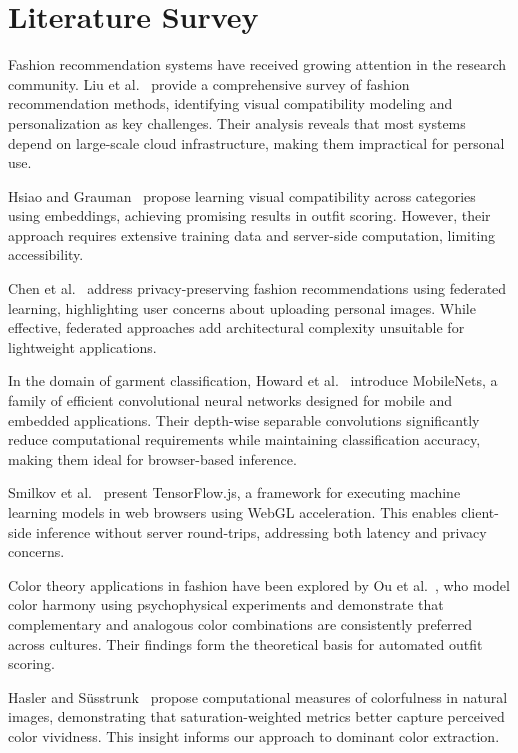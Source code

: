 \documentclass[conference]{IEEEtran}
\begin{document}
\section{Literature Survey}

Fashion recommendation systems have received growing attention in the research community. Liu et al.~\cite{liu2021} provide a comprehensive survey of fashion recommendation methods, identifying visual compatibility modeling and personalization as key challenges. Their analysis reveals that most systems depend on large-scale cloud infrastructure, making them impractical for personal use.

Hsiao and Grauman~\cite{hsiao2018} propose learning visual compatibility across categories using embeddings, achieving promising results in outfit scoring. However, their approach requires extensive training data and server-side computation, limiting accessibility.

Chen et al.~\cite{chen2023} address privacy-preserving fashion recommendations using federated learning, highlighting user concerns about uploading personal images. While effective, federated approaches add architectural complexity unsuitable for lightweight applications.

In the domain of garment classification, Howard et al.~\cite{howard2017} introduce MobileNets, a family of efficient convolutional neural networks designed for mobile and embedded applications. Their depth-wise separable convolutions significantly reduce computational requirements while maintaining classification accuracy, making them ideal for browser-based inference.

Smilkov et al.~\cite{smilkov2019} present TensorFlow.js, a framework for executing machine learning models in web browsers using WebGL acceleration. This enables client-side inference without server round-trips, addressing both latency and privacy concerns.

Color theory applications in fashion have been explored by Ou et al.~\cite{ou2012}, who model color harmony using psychophysical experiments and demonstrate that complementary and analogous color combinations are consistently preferred across cultures. Their findings form the theoretical basis for automated outfit scoring.

Hasler and S\"{u}sstrunk~\cite{hasler2003} propose computational measures of colorfulness in natural images, demonstrating that saturation-weighted metrics better capture perceived color vividness. This insight informs our approach to dominant color extraction.
\end{document}
